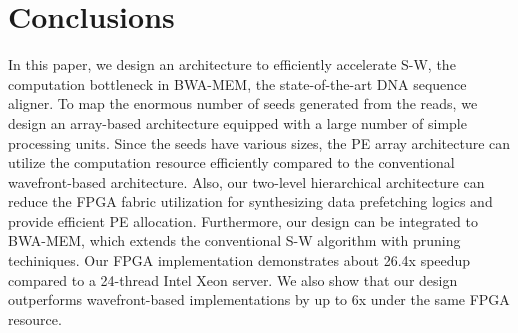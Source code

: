 \section{Conclusions} 
\label{sec:conclusions}
In this paper, we design an architecture to efficiently accelerate S-W, the computation bottleneck in BWA-MEM, the state-of-the-art DNA sequence aligner.
To map the enormous number of seeds generated from the reads, we design an array-based architecture equipped with a large number of simple processing units.
Since the seeds have various sizes, the PE array architecture can utilize the computation resource efficiently compared to the conventional wavefront-based architecture.
Also, our two-level hierarchical architecture can reduce the FPGA fabric utilization for synthesizing data prefetching logics and provide efficient PE allocation.
Furthermore, our design can be integrated to BWA-MEM, which extends the conventional S-W algorithm with pruning techiniques. 
Our FPGA implementation demonstrates about 26.4x speedup compared to a 24-thread Intel Xeon server. 
We also show that our design outperforms wavefront-based implementations by up to 6x under the same FPGA resource.
